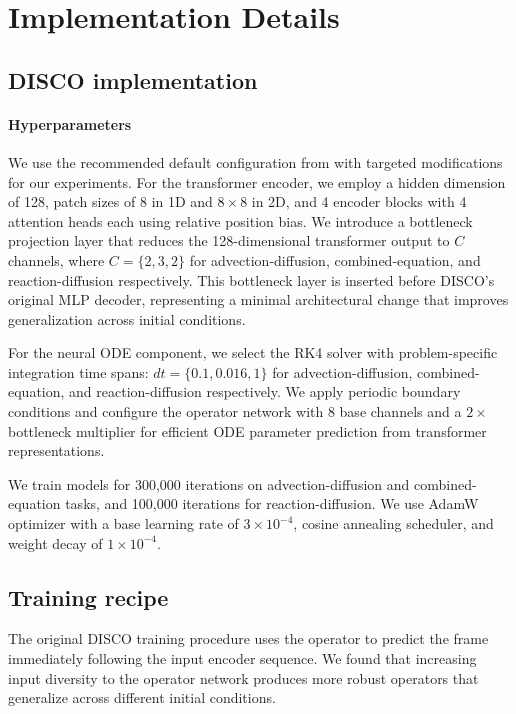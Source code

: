 \documentclass{article}
\theoremstyle{plain}
\theoremstyle{definition}
\theoremstyle{remark}
\begin{document}
\section{Implementation Details}

\subsection{DISCO implementation}

\paragraph{Hyperparameters} We use the recommended default configuration from \cite{morel2025disco} with targeted modifications for our experiments. For the transformer encoder, we employ a hidden dimension of 128, patch sizes of 8 in 1D and $8 \times 8$ in 2D, and 4 encoder blocks with 4 attention heads each using relative position bias. We introduce a bottleneck projection layer that reduces the 128-dimensional transformer output to $C$ channels, where $C = \{2, 3, 2\}$ for advection-diffusion, combined-equation, and reaction-diffusion respectively. This bottleneck layer is inserted before DISCO's original MLP decoder, representing a minimal architectural change that improves generalization across initial conditions.

For the neural ODE component, we select the RK4 solver with problem-specific integration time spans: $dt = \{0.1, 0.016, 1\}$ for advection-diffusion, combined-equation, and reaction-diffusion respectively. We apply periodic boundary conditions and configure the operator network with 8 base channels and a $2\times$ bottleneck multiplier for efficient ODE parameter prediction from transformer representations.

We train models for 300,000 iterations on advection-diffusion and combined-equation tasks, and 100,000 iterations for reaction-diffusion. We use AdamW optimizer with a base learning rate of $3 \times 10^{-4}$, cosine annealing scheduler, and weight decay of $1 \times 10^{-4}$.

\subsection{Training recipe}
The original DISCO training procedure uses the operator to predict the frame immediately following the input encoder sequence. We found that increasing input diversity to the operator network produces more robust operators that generalize across different initial conditions.
\end{document}
